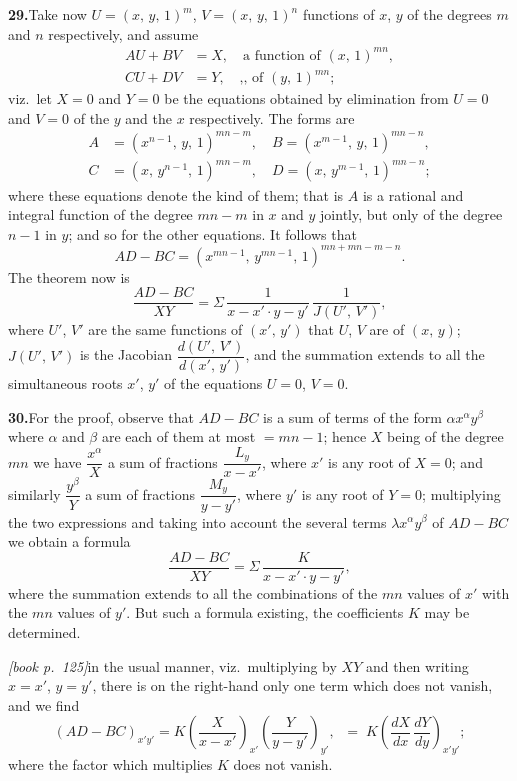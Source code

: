 \documentclass[11pt,a4paper]{article}
\theoremstyle{plain}
\theoremstyle{definition}
\theoremstyle{remark}
\begin{document}
\medskip\noindent\textbf{29.}\quad Take now $U = (x,\,y,\,1)^m$, $V = (x,\,y,\,1)^n$ functions of $x$, $y$ of the degrees $m$ and $n$ respectively, and assume
\begin{align*}
AU + BV &= X,\quad \text{a function of }(x,\,1)^{mn},\\
CU + DV &= Y,\quad \text{,, of }(y,\,1)^{mn};
\end{align*}
viz.\ let $X = 0$ and $Y = 0$ be the equations obtained by elimination from $U = 0$ and $V = 0$ of the $y$ and the $x$ respectively. The forms are
\begin{align*}
A &= (x^{n-1},\,y,\,1)^{mn-m},\quad B = (x^{m-1},\,y,\,1)^{mn-n},\\
C &= (x,\,y^{n-1},\,1)^{mn-m},\quad D = (x,\,y^{m-1},\,1)^{mn-n};
\end{align*}
where these equations denote the kind of them; that is $A$ is a rational and integral function of the degree $mn - m$ in $x$ and $y$ jointly, but only of the degree $n - 1$ in $y$; and so for the other equations. It follows that
\[
AD - BC = (x^{mn-1},\,y^{mn-1},\,1)^{mn+mn-m-n}.
\]
The theorem now is
\[
\frac{AD - BC}{XY} = \Sigma\,\frac{1}{x - x'\cdot y - y'}\,\frac{1}{J(U',\,V')},
\]
where $U'$, $V'$ are the same functions of $(x',\,y')$ that $U$, $V$ are of $(x,\,y)$; $J(U',\,V')$ is the Jacobian $\dfrac{d(U',\,V')}{d(x',\,y')}$, and the summation extends to all the simultaneous roots $x'$, $y'$ of the equations $U = 0$, $V = 0$.

\medskip\noindent\textbf{30.}\quad For the proof, observe that $AD - BC$ is a sum of terms of the form $\alpha x^\alpha y^\beta$ where $\alpha$ and $\beta$ are each of them at most $= mn - 1$; hence $X$ being of the degree $mn$ we have $\dfrac{x^\alpha}{X}$ a sum of fractions $\dfrac{L_y}{x - x'}$, where $x'$ is any root of $X = 0$; and similarly $\dfrac{y^\beta}{Y}$ a sum of fractions $\dfrac{M_y}{y - y'}$, where $y'$ is any root of $Y = 0$; multiplying the two expressions and taking into account the several terms $\lambda x^\alpha y^\beta$ of $AD - BC$ we obtain a formula
\[
\frac{AD - BC}{XY} = \Sigma\,\frac{K}{x - x'\cdot y - y'},
\]
where the summation extends to all the combinations of the $mn$ values of $x'$ with the $mn$ values of $y'$. But such a formula existing, the coefficients $K$ may be determined.

\noindent\textit{[book p.~125]}\quad in the usual manner, viz.\ multiplying by $XY$ and then writing $x = x'$, $y = y'$, there is on the right-hand only one term which does not vanish, and we find
\[
(AD - BC)_{x'y'} = K\!\left(\frac{X}{x - x'}\right)_{x'}\!\left(\frac{Y}{y - y'}\right)_{y'}\!,\;\;=\;K\!\left(\frac{dX}{dx}\,\frac{dY}{dy}\right)_{x'y'};
\]
where the factor which multiplies $K$ does not vanish.
\end{document}

